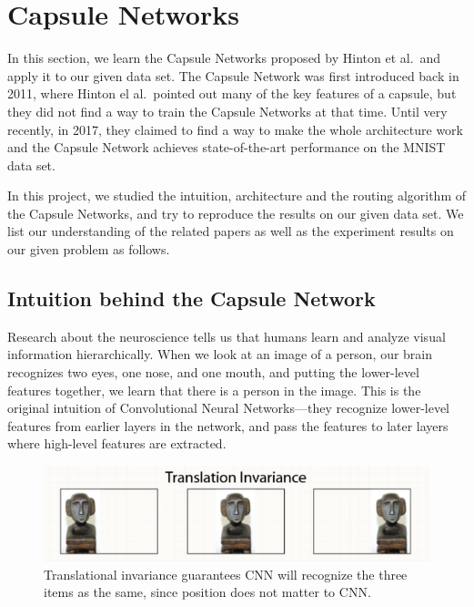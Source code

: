 \documentclass{article}
\begin{document}
\section{Capsule Networks}
In this section, we learn the Capsule Networks proposed by Hinton et al.\ and apply it to our given data set. The Capsule Network was first introduced back in 2011\cite{hinton2011transforming}, where Hinton el al.\ pointed out many of the key features of a capsule, but they did not find a way to train the Capsule Networks at that time. Until very recently, in 2017, they claimed to find a way to make the whole architecture work and the Capsule Network achieves state-of-the-art performance on the MNIST data set\cite{sabour2017dynamic}. 

In this project, we studied the intuition, architecture and the routing algorithm of the Capsule Networks, and try to reproduce the results on our given data set. We list our understanding of the related papers as well as the experiment results on our given problem as follows.

\subsection{Intuition behind the Capsule Network}
Research about the neuroscience tells us that humans learn and analyze visual information hierarchically. When we look at an image of a person, our brain recognizes two eyes, one nose, and one mouth, and putting the lower-level features together, we learn that there is a person in the image. This is the original intuition of Convolutional Neural Networks---they recognize lower-level features from earlier layers in the network, and pass the features to later layers where high-level features are extracted. 

\begin{figure}[!htb]
	\centering\includegraphics[width=1.0\textwidth]{fig/invariance}
	\caption{Translational invariance guarantees CNN will recognize the three items as the same, since position does not matter to CNN.\protect\footnotemark }\label{fig:invariance}
\end{figure}
\end{document}
